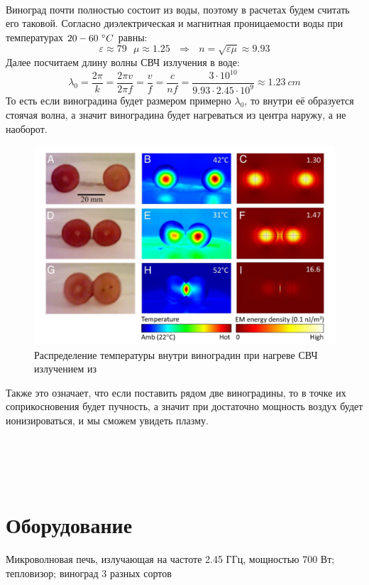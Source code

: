 \documentclass[a4paper,12pt]{article}
\begin{document}
	\\ Виноград почти полностью состоит из воды, поэтому в расчетах будем считать его таковой. Согласно \cite{litlink1} диэлектрическая и магнитная проницаемости воды при температурах $20 - 60 \ \degree C$ равны: 
	\begin{equation}
		\varepsilon \approx 79 \ \ \ \mu \approx 1.25 \ \ \ \Rightarrow \ \ \ n = \sqrt{\varepsilon \mu} \approx 9.93
	\end{equation}
	Далее посчитаем длину волны СВЧ излучения в воде:
	\begin{equation}
		\lambda_0 = \dfrac{2\pi}{k} = \dfrac{2\pi v}{2\pi f} = \dfrac{v}{f} = \dfrac{c}{nf} = \dfrac{3\cdot10^{10}}{9.93 \cdot 2.45 \cdot 10^{9}} \approx 1.23 \ cm
	\end{equation}
	То есть если виноградина будет размером примерно $\lambda_0$, то внутри её образуется стоячая волна, а значит виноградина будет нагреваться из центра наружу, а не наоборот. 
	\begin{figure}[h!]
		\centering
		\includegraphics[scale = 0.355]{art}
		\caption{Распределение температуры внутри виноградин при нагреве СВЧ излучением из \cite{litlink1}}
	\end{figure}
	
	Также это означает, что если поставить рядом две виноградины, то в точке их соприкосновения будет пучность, а значит при достаточно мощность воздух будет ионизироваться, и мы сможем увидеть плазму. 
    \\ \\ \\ \\ \\
	\section{Оборудование}
	Микроволновая печь, излучающая на частоте 2.45 ГГц, мощностью 700 Вт; тепловизор; виноград 3 разных сортов
\end{document}
